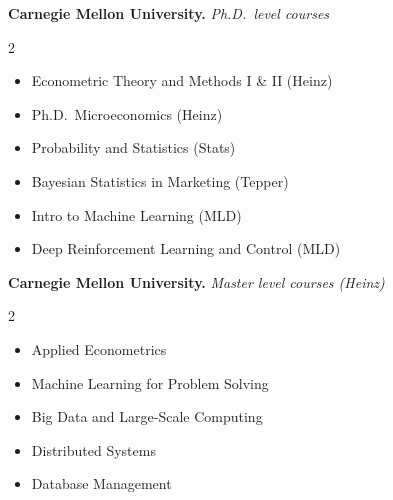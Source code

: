 \documentclass[10pt,letterpaper]{article}
\begin{document}
\textbf{Carnegie Mellon University.} \textit{Ph.D.\ level courses}
\begin{multicols}{2}
\begin{itemize}
\item Econometric Theory and Methods I \& II (Heinz)
\item Ph.D.\ Microeconomics (Heinz)
\item Probability and Statistics (Stats)
\item Bayesian Statistics in Marketing (Tepper)
\item Intro to Machine Learning (MLD)
\item Deep Reinforcement Learning and Control (MLD)
\end{itemize}
\end{multicols}

\textbf{Carnegie Mellon University.} \textit{Master level courses (Heinz)}
\begin{multicols}{2}
\begin{itemize}
\item Applied Econometrics
\item Machine Learning for Problem Solving
\item Big Data and Large-Scale Computing
\item Distributed Systems
\item Database Management
\end{itemize}
\end{multicols}
\end{document}
